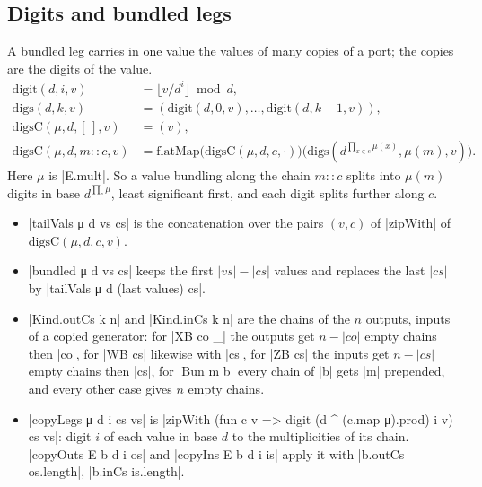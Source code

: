 \subsection{Digits and bundled legs}\label{sec:lean-core-net-digits}

A bundled leg carries in one value the values of many copies of a port; the copies are the digits of
the value.
\begin{align*}
\mathrm{digit}(d,i,v)&=\lfloor v/d^i\rfloor\bmod d,\\
\mathrm{digs}(d,k,v)&=(\mathrm{digit}(d,0,v),\dots,\mathrm{digit}(d,k-1,v)),\\
\mathrm{digsC}(\mu,d,[\,],v)&=(v),\\
\mathrm{digsC}(\mu,d,m{::}c,v)&=\mathrm{flatMap}\bigl(\mathrm{digsC}(\mu,d,c,\cdot)\bigr)
  \bigl(\mathrm{digs}(d^{\prod_{x\in c}\mu(x)},\mu(m),v)\bigr).
\end{align*}
Here $\mu$ is \lean|E.mult|. So a value bundling along the chain $m{::}c$ splits into $\mu(m)$ digits
in base $d^{\prod_c\mu}$, least significant first, and each digit splits further along $c$.
\begin{itemize}
\item \lean|tailVals μ d vs cs| is the concatenation over the pairs $(v,c)$ of \lean|zipWith| of
  $\mathrm{digsC}(\mu,d,c,v)$.
\item \lean|bundled μ d vs cs| keeps the first $|vs|-|cs|$ values and replaces the last $|cs|$ by
  \lean|tailVals μ d (last values) cs|.
\item \lean|Kind.outCs k n| and \lean|Kind.inCs k n| are the chains of the $n$ outputs, inputs of a
  copied generator: for \lean|XB co _| the outputs get $n-|co|$ empty chains then \lean|co|, for
  \lean|WB cs| likewise with \lean|cs|, for \lean|ZB cs| the inputs get $n-|cs|$ empty chains then
  \lean|cs|, for \lean|Bun m b| every chain of \lean|b| gets \lean|m| prepended, and every other
  case gives $n$ empty chains.
\item \lean|copyLegs μ d i cs vs| is \lean|zipWith (fun c v => digit (d ^ (c.map μ).prod) i v) cs vs|:
  digit $i$ of each value in base $d$ to the multiplicities of its chain.
  \lean|copyOuts E b d i os| and \lean|copyIns E b d i is| apply it with \lean|b.outCs os.length|,
  \lean|b.inCs is.length|.
\end{itemize}

